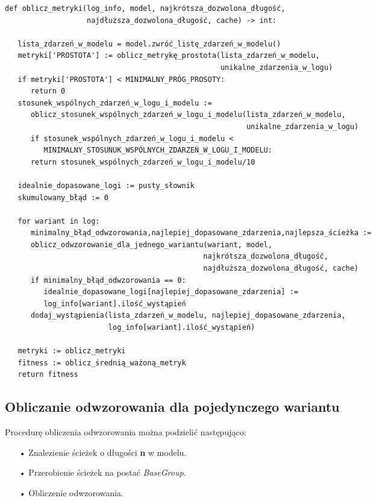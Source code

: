 \lstset{caption=Obliczanie metryk, captionpos=b}
\lstset{label=src:best_result, frame=single}
\begin{lstlisting}[escapeinside=``]
def oblicz_metryki(log_info, model, najkrótsza_dozwolona_długość, 
                   najdłuższa_dozwolona_długość, cache) -> int:
                   
   lista_zdarzeń_w_modelu = model.zwróć_listę_zdarzeń_w_modelu()
   metryki['PROSTOTA'] := oblicz_metrykę_prostota(lista_zdarzeń_w_modelu, 
                                                  unikalne_zdarzenia_w_logu)
   if metryki['PROSTOTA'] < MINIMALNY_PRÓG_PROSOTY:
      return 0
   stosunek_wspólnych_zdarzeń_w_logu_i_modelu := 
      oblicz_stosunek_wspólnych_zdarzeń_w_logu_i_modelu(lista_zdarzeń_w_modelu, 
                                                        unikalne_zdarzenia_w_logu)		   
      if stosunek_wspólnych_zdarzeń_w_logu_i_modelu <
         MINIMALNY_STOSUNUK_WSPÓLNYCH_ZDARZEŃ_W_LOGU_I_MODELU:
      return stosunek_wspólnych_zdarzeń_w_logu_i_modelu/10
        
   idealnie_dopasowane_logi := pusty_słownik
   skumulowany_błąd := 0
    
   for wariant in log:
      minimalny_błąd_odwzorowania,najlepiej_dopasowane_zdarzenia,najlepsza_ścieżka := 
      oblicz_odwzorowanie_dla_jednego_wariantu(wariant, model, 
                                              najkrótsza_dozwolona_długość, 
                                              najdłuższa_dozwolona_długość, cache)
      if minimalny_błąd_odwzorowania == 0:
         idealnie_dopasowane_logi[najlepiej_dopasowane_zdarzenia] := 
         log_info[wariant].ilość_wystąpień
      dodaj_wystąpienia(lista_zdarzeń_w_modelu, najlepiej_dopasowane_zdarzenia, 
                        log_info[wariant].ilość_wystąpień)

   metryki := oblicz_metryki 
   fitness := oblicz_średnią_ważoną_metryk
   return fitness
\end{lstlisting}

\subsection{Obliczanie odwzorowania dla pojedynczego wariantu}
Procedurę obliczenia odwzorowania można podzielić następująco:
\begin{itemize}
  \item[•] Znalezienie ścieżek o długości \textbf{n} w modelu.
  \item[•] Przerobienie ścieżek na postać \textit{BaseGroup}.
  \item[•] Obliczenie odwzorowania.
\end{itemize}

